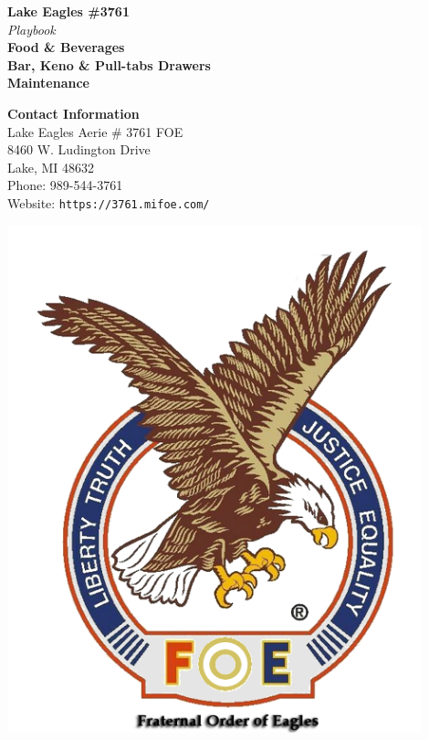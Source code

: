 \documentclass[a0,landscape]{a0poster}
\begin{document}

\begin{minipage}[b]{0.55\linewidth}
\veryHuge \color{NavyBlue} \textbf{Lake Eagles \#3761} \color{Black}\\ %
\Huge\textit{ Playbook }\\[1cm] %
\huge \textbf{
Food \& Beverages \\ 
Bar, Keno \& Pull-tabs Drawers\\
Maintenance }\\ %
\end{minipage}
%
\begin{minipage}[b]{0.25\linewidth}
\color{DarkSlateGray}\Large \textbf{Contact Information}\\
Lake Eagles Aerie \# 3761 FOE\\ %
8460 W. Ludington Drive \\
Lake, MI 48632 \\
Phone: 989-544-3761 \\ %
Website: \texttt{https://3761.mifoe.com/}\\ %
\end{minipage}
%
\begin{minipage}[b]{0.19\linewidth}
\includegraphics[width=12cm]{./FOE.png} %
\end{minipage}
\end{document}
